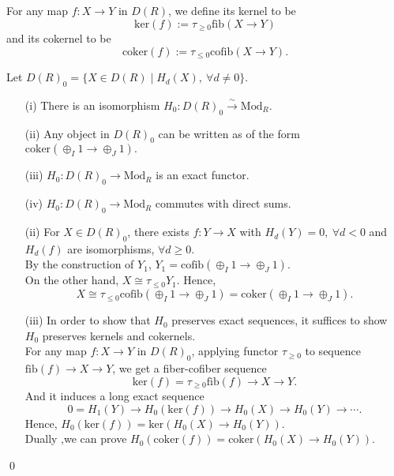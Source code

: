 \documentclass[UTF8,12,a4paper]{ctexart}
\theoremstyle{definition}
\begin{document}
\dfn 
For any map $f:X\rightarrow Y$ in $D(R)$, we define its kernel to be $$\text{ker}(f):=\tau_{\geq 0} \text{fib}(X\to Y)$$ and its cokernel to be $$\text{coker}(f):=\tau_{\leq 0} \text{cofib}(X\to Y).$$

\prop 
Let $D(R)_0=\{X\in D(R)\mid H_d(X),\ \forall d\neq 0\}$.
\begin{itemize}
	\item [(i)]There is an isomorphism
	$
	H_0:D(R)_0\stackrel{\sim}{\longrightarrow}\text{Mod}_R.
	$
	\item [(ii)] Any object in $D(R)_0$ can be written as of the form $\text{coker}(\oplus_I 1\to \oplus_J 1).$
	\item [(iii)] $H_0:D(R)_0\longrightarrow\text{Mod}_R$ is an exact functor.
	\item [(iv)]$H_0:D(R)_0\longrightarrow\text{Mod}_R$ commutes with direct sums.
\end{itemize}
\pf 
\begin{itemize}
	\item [(ii)] For $X\in D(R)_0$, there exists $f: Y\to X$ with $H_d(Y)=0,\ \forall d<0$ and $H_d(f)$ are isomorphisms, $\forall d\geq 0$. \\
	By the construction of $Y_1$, $Y_1=\text{cofib}(\oplus_I 1\to \oplus_J 1).$ \\
	On the other hand, $X\cong \tau_{\leq 0} Y_1$. Hence,
	$$
	X\cong \tau_{\leq 0}\text{cofib}(\oplus_I 1\to \oplus_J 1)=\text{coker}(\oplus_I 1\to \oplus_J 1).
	$$
	\item [(iii)]
	In order to show that $H_0$ preserves exact sequences, it suffices to show $H_0$ preserves kernels and cokernels.\\
	For any map $f:X\to Y$ in $D(R)_0$, applying functor $\tau_{\geq 0}$ to sequence $\text{fib}(f)\to X\to Y$, we get a fiber-cofiber sequence 
	$$
	\text{ker}(f)=\tau_{\geq 0}\text{fib}(f)\to X\to Y.
	$$
	And it induces a long exact sequence
	$$
	0=H_1(Y)\rightarrow H_0(\text{ker}(f))\rightarrow H_0(X)\rightarrow H_0(Y)\rightarrow\cdots.
	$$
	Hence, $H_0(\text{ker}(f))=\text{ker}(H_0(X)\rightarrow H_0(Y)).$\\
	Dually ,we can prove $H_0(\text{coker}(f))=\text{coker}(H_0(X)\rightarrow H_0(Y)).$
\end{itemize}
\qed
\end{document}
